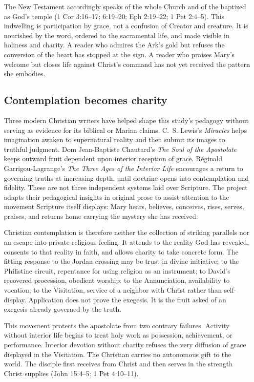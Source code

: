 The New Testament accordingly speaks of the whole Church and of the baptized
as God's temple (1 Cor 3:16--17; 6:19--20; Eph 2:19--22; 1 Pet 2:4--5).  This
indwelling is participation by grace, not a confusion of Creator and creature.
It is nourished by the word, ordered to the sacramental life, and made visible
in holiness and charity.  A reader who admires the Ark's gold but refuses the
conversion of the heart has stopped at the sign.  A reader who praises Mary's
welcome but closes life against Christ's command has not yet received the
pattern she embodies.

\subsection{Contemplation becomes charity}

Three modern Christian writers have helped shape this study's pedagogy without
serving as evidence for its biblical or Marian claims.  C.~S. Lewis's
\emph{Miracles} helps imagination awaken to supernatural reality and then
submit its images to truthful judgment.  Dom Jean-Baptiste Chautard's
\emph{The Soul of the Apostolate} keeps outward fruit dependent upon interior
reception of grace.  Réginald Garrigou-Lagrange's \emph{The Three Ages of the
Interior Life} encourages a return to governing truths at increasing depth,
until doctrine opens into contemplation and fidelity.  These are not three
independent systems laid over Scripture.  The project adapts their pedagogical
insights in original prose to assist attention to the movement Scripture itself
displays: Mary hears, believes, conceives, rises, serves, praises, and returns
home carrying the mystery she has received.

Christian contemplation is therefore neither the collection of striking
parallels nor an escape into private religious feeling.  It attends to the
reality God has revealed, consents to that reality in faith, and allows charity
to take concrete form.  The fitting response to the Jordan crossing may be
trust in divine initiative; to the Philistine circuit, repentance for using
religion as an instrument; to David's recovered procession, obedient worship;
to the Annunciation, availability to vocation; to the Visitation, service of a
neighbor with Christ rather than self-display.  Application does not prove the
exegesis.  It is the fruit asked of an exegesis already governed by the truth.

This movement protects the apostolate from two contrary failures.  Activity
without interior life begins to treat holy work as possession, achievement, or
performance.  Interior devotion without charity refuses the very diffusion of
grace displayed in the Visitation.  The Christian carries no autonomous gift
to the world.  The disciple first receives from Christ and then serves in the
strength Christ supplies (John 15:4--5; 1 Pet 4:10--11).

